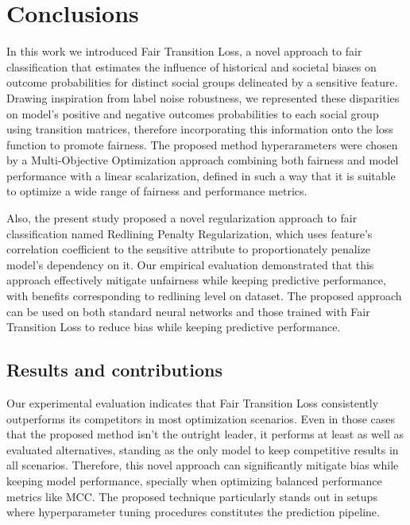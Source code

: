 \chapter{Conclusions}\label{chap:conclusions}



In this work we introduced Fair Transition Loss, a novel approach to fair classification that estimates the influence of historical and societal biases on outcome probabilities for distinct social groups delineated by a sensitive feature. Drawing inspiration from label noise robustness, we represented these disparities on model's positive and negative outcomes probabilities to each social group using transition matrices, therefore incorporating this information onto the loss function to promote fairness. The proposed method hyperarameters were chosen by a Multi-Objective Optimization approach combining both fairness and model performance with a linear scalarization, defined in such a way that it is suitable to optimize a wide range of fairness and performance metrics.

Also, the present study proposed a novel regularization approach to fair classification named Redlining Penalty Regularization, which uses feature's correlation coefficient to the sensitive attribute to proportionately penalize model's dependency on it. Our empirical evaluation demonstrated that this approach effectively mitigate unfairness while keeping predictive performance, with benefits corresponding to redlining level on dataset. The proposed approach can be used on both standard neural networks and those trained with Fair Transition Loss to reduce bias while keeping predictive performance.

\section{Results and contributions}

Our experimental evaluation indicates that Fair Transition Loss consistently outperforms its competitors in most optimization scenarios. Even in those cases that the proposed method isn't the outright leader, it performs at least as well as evaluated alternatives, standing as the only model to keep competitive results in all scenarios. Therefore, this novel approach can significantly mitigate bias while keeping model performance, specially when optimizing balanced performance metrics like MCC. The proposed technique particularly stands out in setups where hyperparameter tuning procedures constitutes the prediction pipeline.

